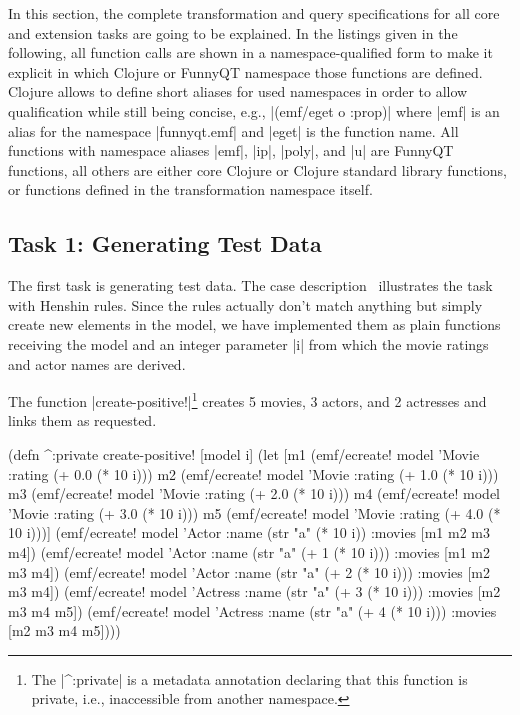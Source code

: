 \documentclass[submission]{eptcs}
\newcommand{\code}{\clojureinline}
\begin{document}
In this section, the complete transformation and query specifications for all
core and extension tasks are going to be explained.  In the listings given in
the following, all function calls are shown in a namespace-qualified form to
make it explicit in which Clojure or FunnyQT namespace those functions are
defined.  Clojure allows to define short aliases for used namespaces in order
to allow qualification while still being concise, e.g., \code|(emf/eget o
:prop)| where \code|emf| is an alias for the namespace \code|funnyqt.emf| and
\code|eget| is the function name.  All functions with namespace aliases
\code|emf|, \code|ip|, \code|poly|, and \code|u| are FunnyQT functions, all
others are either core Clojure or Clojure standard library functions, or
functions defined in the transformation namespace itself.


\subsection{Task 1: Generating Test Data}
\label{sec:task-1:generating-test-data}

The first task is generating test data.  The case
description~\cite{movies-case-desc} illustrates the task with Henshin rules.
Since the rules actually don't match anything but simply create new elements in
the model, we have implemented them as plain functions receiving the model and
an integer parameter \code|i| from which the movie ratings and actor names are
derived.

The function \code|create-positive!|\footnote{The \code|^:private| is a
  metadata annotation declaring that this function is private, i.e.,
  inaccessible from another namespace.} creates 5 movies, 3 actors, and 2
actresses and links them as requested.

\begin{clojurecode}
(defn ^:private create-positive! [model i]
  (let [m1 (emf/ecreate! model 'Movie :rating (+ 0.0 (* 10 i)))
        m2 (emf/ecreate! model 'Movie :rating (+ 1.0 (* 10 i)))
        m3 (emf/ecreate! model 'Movie :rating (+ 2.0 (* 10 i)))
        m4 (emf/ecreate! model 'Movie :rating (+ 3.0 (* 10 i)))
        m5 (emf/ecreate! model 'Movie :rating (+ 4.0 (* 10 i)))]
    (emf/ecreate! model 'Actor   :name (str "a" (* 10 i))       :movies [m1 m2 m3 m4])
    (emf/ecreate! model 'Actor   :name (str "a" (+ 1 (* 10 i))) :movies [m1 m2 m3 m4])
    (emf/ecreate! model 'Actor   :name (str "a" (+ 2 (* 10 i))) :movies [m2 m3 m4])
    (emf/ecreate! model 'Actress :name (str "a" (+ 3 (* 10 i))) :movies [m2 m3 m4 m5])
    (emf/ecreate! model 'Actress :name (str "a" (+ 4 (* 10 i))) :movies [m2 m3 m4 m5])))
\end{clojurecode}
\end{document}

